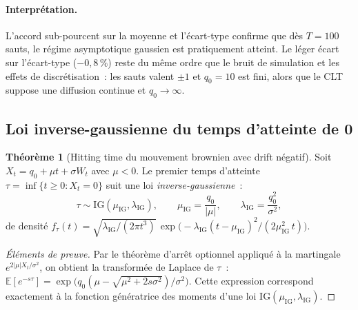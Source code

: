 \documentclass[11pt,a4paper]{article}
\theoremstyle{definition}
\newtheorem{theoreme}[proposition]{Théorème}
\newcommand{\E}{\mathbb{E}}
\newcommand{\IG}{\mathrm{IG}}
\begin{document}
\begin{demonstration}
\paragraph{Interprétation.}
L'accord sub-pourcent sur la moyenne et l'écart-type confirme que dès $T=100$
sauts, le régime asymptotique gaussien est pratiquement atteint.
Le léger écart sur l'écart-type ($-0{,}8\,\%$) reste du même ordre que le
bruit de simulation et les effets de discrétisation~: les sauts valent
$\pm1$ et $q_0=10$ est fini, alors que le CLT suppose une diffusion continue
et $q_0\to\infty$.

\end{demonstration}

\subsection{Loi inverse-gaussienne du temps d'atteinte de 0}

\begin{theoreme}[Hitting time du mouvement brownien avec drift négatif]
\label{thm:ig}
Soit $X_t = q_0 + \mu t + \sigma W_t$ avec $\mu < 0$.
Le premier temps d'atteinte $\tau = \inf\{t\ge0 : X_t=0\}$ suit une
loi \emph{inverse-gaussienne}~:
\[
  \tau \sim \IG(\mu_\IG, \lambda_\IG),
  \qquad
  \mu_\IG = \frac{q_0}{|\mu|},
  \qquad
  \lambda_\IG = \frac{q_0^2}{\sigma^2},
\]
de densité $f_\tau(t)=\sqrt{\lambda_\IG/(2\pi t^3)}\,\exp\!\bigl(-\lambda_\IG(t-\mu_\IG)^2/(2\mu_\IG^2\,t)\bigr)$.
\end{theoreme}

\begin{proof}[Éléments de preuve]
Par le théorème d'arrêt optionnel appliqué à la martingale
$e^{2|\mu|X_t/\sigma^2}$, on obtient la transformée de Laplace de $\tau$~:
$\E[e^{-s\tau}] = \exp\bigl(q_0(\mu-\sqrt{\mu^2+2s\sigma^2})/\sigma^2\bigr)$.
Cette expression correspond exactement à la fonction génératrice des moments
d'une loi $\IG(\mu_\IG,\lambda_\IG)$.
\end{proof}
\end{document}
